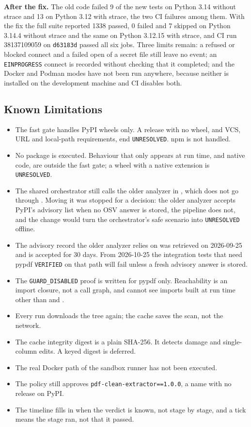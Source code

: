 \begin{sloppypar}
\textbf{After the fix.} The old code failed 9 of the new tests on Python 3.14 without strace and 13 on Python 3.12 with strace, the two CI failures among them. With the fix the full suite reported 1338 passed, 0 failed and 7 skipped on Python 3.14.4 without strace and the same on Python 3.12.15 with strace, and CI run 38137109059 on \texttt{d63183d} passed all six jobs. Three limits remain: a refused or blocked connect and a failed open of a secret file still leave no event; an \texttt{EINPROGRESS} connect is recorded without checking that it completed; and the Docker and Podman modes have not been run anywhere, because neither is installed on the development machine and CI disables both.
\end{sloppypar}

\subsection{Known Limitations}
\begin{itemize}
    \item The fast gate handles PyPI wheels only. A release with no wheel, and VCS, URL and local-path requirements, end \texttt{UNRESOLVED}. npm is not handled.
    \item No package is executed. Behaviour that only appears at run time, and native code, are outside the fast gate; a wheel with a native extension is \texttt{UNRESOLVED}.
    \item The shared orchestrator still calls the older analyzer in , which does not go through . Moving it was stopped for a decision: the older analyzer accepts PyPI's advisory list when no OSV answer is stored, the pipeline does not, and the change would turn the orchestrator's safe scenario into \texttt{UNRESOLVED} offline.
    \item The advisory record the older analyzer relies on was retrieved on 2026-09-25 and is accepted for 30 days. From 2026-10-25 the integration tests that need pypdf \texttt{VERIFIED} on that path will fail unless a fresh advisory answer is stored.
    \item The \texttt{GUARD\_DISABLED} proof is written for pypdf only. Reachability is an import closure, not a call graph, and cannot see imports built at run time other than  and .
    \item Every run downloads the tree again; the cache saves the scan, not the network.
    \item The cache integrity digest is a plain SHA-256. It detects damage and single-column edits. A keyed digest is deferred.
    \item The real Docker path of the sandbox runner has not been executed.
    \item The policy still approves \texttt{pdf-clean-extractor==1.0.0}, a name with no release on PyPI.
    \item The timeline fills in when the verdict is known, not stage by stage, and a tick means the stage ran, not that it passed.
\end{itemize}
